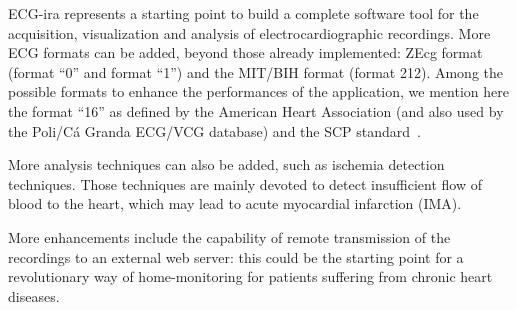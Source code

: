 ECG-ira represents a starting point to build a complete software tool for the acquisition, visualization and analysis of electrocardiographic recordings. More ECG formats can be added, beyond those already implemented: ZEcg format (format ``0'' and format ``1'') and the MIT/BIH format (format 212). Among the possible formats to enhance the performances of the application, we mention here the format ``16'' as defined by the American Heart Association (and also used by the Poli/C\'a Granda ECG/VCG database) and the SCP standard~\cite{ref28}.

More analysis techniques can also be added, such as ischemia detection techniques. Those techniques are mainly devoted to detect insufficient flow of blood to the heart, which may lead to acute myocardial infarction (IMA).

More enhancements include the capability of remote transmission of the recordings to an external web server: this could be the starting point for a revolutionary way of home-monitoring for patients suffering from chronic heart diseases.
